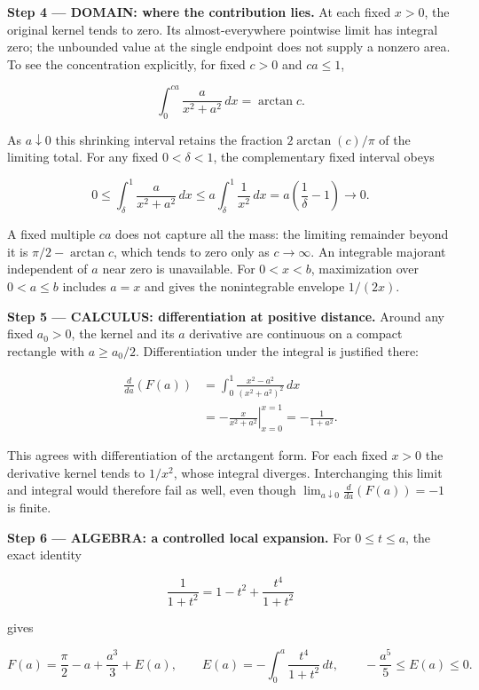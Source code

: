 \documentclass[11pt,oneside,openany]{book}
\begin{document}
\begin{DomainStep}
\textbf{Step 4 --- DOMAIN: where the contribution lies.} At each fixed \(x>0\), the original kernel tends to zero. Its almost-everywhere pointwise limit has integral zero; the unbounded value at the single endpoint does not supply a nonzero area. To see the concentration explicitly, for fixed \(c>0\) and \(ca\le1\),

\[
\int_0^{ca}\frac{a}{x^2+a^2}\,dx=\arctan c.
\]

As \(a\downarrow0\) this shrinking interval retains the fraction \(2\arctan(c)/\pi\) of the limiting total. For any fixed \(0<\delta<1\), the complementary fixed interval obeys

\[
0\le\int_\delta^1\frac{a}{x^2+a^2}\,dx
\le a\int_\delta^1\frac1{x^2}\,dx
=a\left(\frac1\delta-1\right)\longrightarrow0.
\]

A fixed multiple \(ca\) does not capture all the mass: the limiting remainder beyond it is \(\pi/2-\arctan c\), which tends to zero only as \(c\to\infty\). An integrable majorant independent of \(a\) near zero is unavailable. For \(0<x<b\), maximization over \(0<a\le b\) includes \(a=x\) and gives the nonintegrable envelope \(1/(2x)\).

\end{DomainStep}
\textbf{Step 5 --- CALCULUS: differentiation at positive distance.} Around any fixed \(a_0>0\), the kernel and its \(a\) derivative are continuous on a compact rectangle with \(a\ge a_0/2\). Differentiation under the integral is justified there:

\[
\begin{aligned}
\frac{d}{da}(F(a))
&=\int_0^1\frac{x^2-a^2}{(x^2+a^2)^2}\,dx\\
&=\left.-\frac{x}{x^2+a^2}\right|_{x=0}^{x=1}
=-\frac1{1+a^2}.
\end{aligned}
\]

This agrees with differentiation of the arctangent form. For each fixed \(x>0\) the derivative kernel tends to \(1/x^2\), whose integral diverges. Interchanging this limit and integral would therefore fail as well, even though \(\lim_{a\downarrow0}\frac{d}{da}(F(a))=-1\) is finite.

\begingroup\color{AlgebraBlue}
\textbf{Step 6 --- ALGEBRA: a controlled local expansion.} For \(0\le t\le a\), the exact identity

\[
\frac1{1+t^2}=1-t^2+\frac{t^4}{1+t^2}
\]

gives

\[
F(a)=\frac\pi2-a+\frac{a^3}{3}+E(a),\qquad
E(a)=-\int_0^a\frac{t^4}{1+t^2}\,dt,\qquad
-\frac{a^5}{5}\le E(a)\le0.
\]
\end{document}
